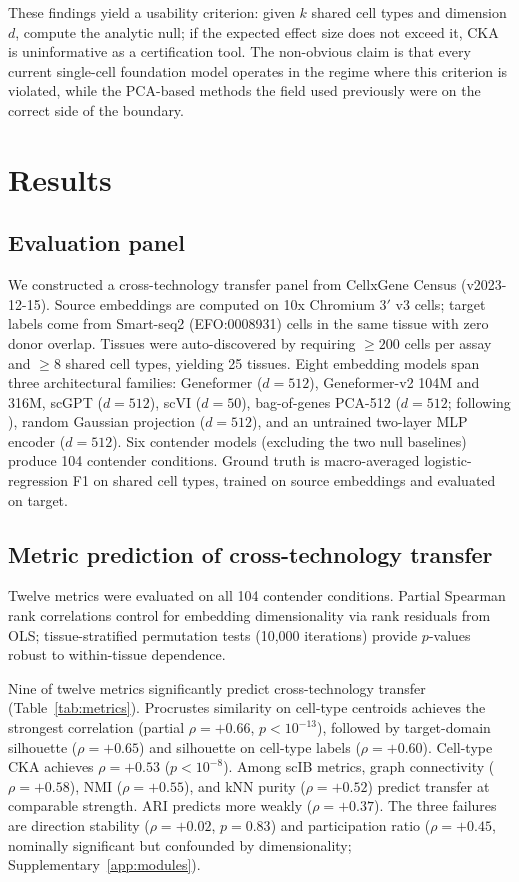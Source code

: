 \documentclass[11pt]{article}
\begin{document}
These findings yield a usability criterion: given $k$ shared cell types
and dimension $d$, compute the analytic null; if the expected effect
size does not exceed it, CKA is uninformative as a certification tool.
The non-obvious claim is that every current single-cell foundation model
operates in the regime where this criterion is violated, while the
PCA-based methods the field used previously were on the correct side of
the boundary.


\section{Results}

\subsection{Evaluation panel}
\label{sec:panel}

We constructed a cross-technology transfer panel from CellxGene Census
(v2023-12-15). Source embeddings are computed on 10x Chromium 3$'$ v3
cells; target labels come from Smart-seq2 (EFO:0008931) cells in the
same tissue with zero donor overlap. Tissues were auto-discovered by
requiring $\geq 200$ cells per assay and $\geq 8$ shared cell types,
yielding 25 tissues. Eight embedding models
span three architectural families: Geneformer \citep{theodoris2023geneformer}
($d = 512$), Geneformer-v2 104M and 316M, scGPT \citep{cui2024scgpt}
($d = 512$), scVI \citep{lopez2018scvi} ($d = 50$), bag-of-genes
PCA-512 ($d = 512$; following \citealp{cole2026morpheus}), random
Gaussian projection ($d = 512$), and an untrained two-layer MLP encoder
($d = 512$). Six contender models (excluding the two null baselines)
produce 104 contender conditions. Ground truth is macro-averaged
logistic-regression F1 on shared cell types, trained on source
embeddings and evaluated on target.


\subsection{Metric prediction of cross-technology transfer}
\label{sec:prediction}

Twelve metrics were evaluated on all 104 contender conditions. Partial
Spearman rank correlations control for embedding dimensionality via rank
residuals from OLS; tissue-stratified permutation tests (10,000
iterations) provide $p$-values robust to within-tissue dependence.

Nine of twelve metrics significantly predict cross-technology transfer
(Table~\ref{tab:metrics}). Procrustes similarity on cell-type centroids
achieves the strongest correlation (partial $\rho = +0.66$,
$p < 10^{-13}$), followed by target-domain silhouette ($\rho = +0.65$)
and silhouette on cell-type labels ($\rho = +0.60$). Cell-type CKA
achieves $\rho = +0.53$ ($p < 10^{-8}$). Among scIB metrics, graph
connectivity ($\rho = +0.58$), NMI ($\rho = +0.55$), and kNN purity
($\rho = +0.52$) predict transfer at comparable strength. ARI predicts
more weakly ($\rho = +0.37$). The three failures are
direction stability ($\rho = +0.02$, $p = 0.83$) and
participation ratio ($\rho = +0.45$, nominally significant but
confounded by dimensionality; Supplementary~\ref{app:modules}).
\end{document}
